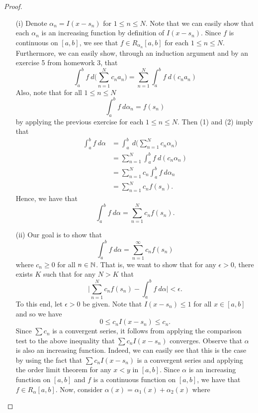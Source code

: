 \documentclass[a4paper]{article}
\begin{document}
\begin{proof}
    \begin{enumerate}
        \item[(i)] Denote \( {\alpha}_{n} = I(x - {s}_{n}) \) for \( 1 \leq n \leq N  \). Note that we can easily show that each \( {\alpha}_{n} \) is an increasing function by definition of \( I(x - {s}_{n}) \). Since \( f  \) is continuous on \( [a,b] \), we see that \( f \in R_{{\alpha}_{n}}[a,b] \) for each \( 1 \leq n \leq N \). Furthermore, we can easily show, through an induction argument and by an exercise 5 from homework 3, that
            \[  \int_{ a }^{ b } f  \ d \Big(  \sum_{ n=1  }^{  N  } {c}_{n} {a}_{n} \Big) = \sum_{ n=1  }^{ N  } \int_{ a }^{ b }  f  \ d ({c}_{n} {a}_{n}) \tag{1}  \]
    Also, note that for all \( 1 \leq n \leq N  \)
    \[  \int_{ a }^{ b } f  \ d \alpha_n = f({s}_{n}) \tag{2}   \]
by applying the previous exercise for each \( 1 \leq n \leq N  \).
    Then (1) and (2) imply that
    \begin{align*}
        \int_{ a }^{ b } f \ d \alpha &= \int_{ a }^{ b }  \ d \Big(  \sum_{ n=1  }^{ N } {c}_{n} {\alpha}_{n} \Big) \\
                                      &= \sum_{ n=1  }^{ N } \int_{ a }^{ b } f  \ d ({c}_{n} {\alpha}_{n}) \\
                                      &= \sum_{ n=1 }^{ N } {c}_{n} \int_{ a }^{ b } f   \ d {\alpha}_{n} \tag{Exercise 5 from HW3} \\
                                      &= \sum_{ n=1  }^{ N  } {c}_{n} f({s}_{n}).
    \end{align*}
    Hence, we have that 
    \[  \int_{ a }^{ b }  f \ d \alpha = \sum_{ n=1  }^{ N  } {c}_{n} f({s}_{n}). \]
\item[(ii)] Our goal is to show that 
    \[  \int_{ a }^{ b }  f  \ d \alpha = \sum_{ n=1  }^{ \infty  } {c}_{n} f({s}_{n})\]
    where \( {c}_{n} \geq 0  \) for all \( n \in \mathbb{N} \). That is, we want to show that for any \( \epsilon > 0  \), there exists \( K  \) such that for any \( N  > K  \) that   
    \[  \Big| \sum_{ n=1  }^{ N  } {c}_{n} f({s}_{n}) - \int_{ a }^{ b }  f  \ d \alpha \Big| < \epsilon. \tag{*} \]
    To this end, let \( \epsilon > 0  \) be given.
    Note that \( I(x- {s}_{n}) \leq 1  \) for all \( x \in [a,b] \) and so we have 
    \[   0 \leq {c}_{n} I(x- {s}_{n}) \leq {c}_{n}.  \]
    Since \( \sum  {c}_{n} \) is a convergent series, it follows from applying the comparison test to the above inequality that \( \sum  {c}_{n} I(x- {s}_{n}) \) converges. Observe that \( \alpha \) is also an increasing function. Indeed, we can easily see that this is the case by using the fact that \( \sum  {c}_{n} I(x- {s}_{n}) \) is a convergent series and applying the order limit theorem for any \( x < y  \) in \( [a,b] \). Since \( \alpha \) is an increasing function on \( [a,b] \) and \( f  \) is a continuous function on \( [a,b] \), we have that \( f \in {R}_{\alpha}[a,b] \). Now, consider \( \alpha(x) = {\alpha}_{1}(x) + {\alpha}_{2}(x) \) where

\end{enumerate}
\end{proof}
\end{document}
